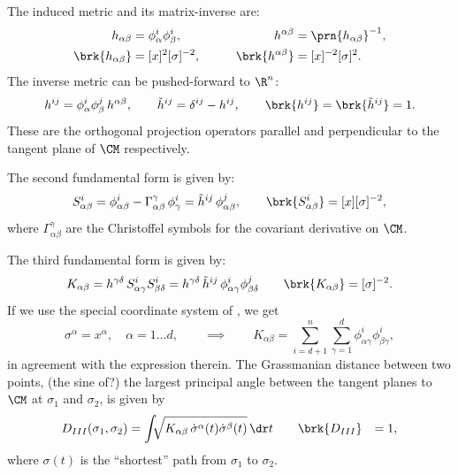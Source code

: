 \documentclass[12pt]{article}
\newcommand{\inv}{^{-1}}
\newcommand{\invsq}{^{-2}}
\begin{document}
The induced metric and its matrix-inverse are:
%
\begin{equation}\label{eq:inducedmet}
\begin{aligned}
  h_{\alpha\beta} &= \phi^i_\alpha \phi^i_\beta, \qquad&
  h^{\alpha\beta} &= \prn{h_{\alpha\beta}}\inv, \\
  \brk{h_{\alpha\beta}} &= [x]^2[\sigma]\invsq, \qquad&
  \brk{h^{\alpha\beta}} &= [x]\invsq[\sigma]^2. \\
\end{aligned}
\end{equation}
%
The inverse metric can be pushed-forward to $\R^n$:
%
\begin{equation}\label{eq:proj}
  h^{ij} = \phi^i_\alpha \phi^j_\beta \, h^{\alpha\beta}, \qquad
  \tilde{h}^{ij} = \delta^{ij} - h^{ij}, \qquad
  \brk{h^{ij}} = \brk{ \tilde{h}^{ij}} = 1.
\end{equation}
%
These are the orthogonal projection operators parallel and perpendicular to the tangent plane of $\CM$ respectively.

The second fundamental form is given by:
%
\begin{equation}\label{eq:extcurvtensor}
  S^i_{\alpha\beta} = \phi^i_{\alpha\beta} - \Gamma^\gamma_{\alpha\beta} \, \phi^i_\gamma
                    = \tilde{h}^{ij} \, \phi^j_{\alpha\beta},
  \qquad
  \brk{S^i_{\alpha\beta}} = [x][\sigma]\invsq,
\end{equation}
%
where $\Gamma^\gamma_{\alpha\beta}$ are the Christoffel symbols for the covariant derivative on $\CM$.

The third fundamental form is given by:
%
\begin{equation}\label{eq:grassmet}
  K_{\alpha\beta} = h^{\gamma\delta} \,  S^i_{\alpha\gamma} S^i_{\beta\delta}
                  = h^{\gamma\delta} \, \tilde{h}^{ij} \, \phi^i_{\alpha\gamma} \phi^j_{\beta\delta}
  \qquad
  \brk{K_{\alpha\beta}}=[\sigma]\invsq.
\end{equation}
%
If we use the special coordinate system of \cite[Appendix B]{clarkson2008tighter}, we get
%
\begin{equation}\label{eq:specialcoord}
  \sigma^\alpha = x^\alpha, \quad \alpha=1\ldots d,
  \qquad \implies \qquad
  K_{\alpha\beta} = \sum_{i=d+1}^n \sum_{\gamma=1}^d \phi^i_{\alpha\gamma} \phi^i_{\beta\gamma},
\end{equation}
%
in agreement with the expression therein.
The Grassmanian distance between two points, \ie (the sine of?) the largest principal angle between the tangent planes to $\CM$ at $\sigma_1$ and $\sigma_2$, is given by
%
\begin{equation}\label{eq:grass_dist_explicit}
\begin{aligned}
  D_{III}(\sigma_1,\sigma_2) &= \int\!\!\! \sqrt{K_{\alpha\beta} \, \dot{\sigma}^\alpha(t)\dot{\sigma}^\beta(t)}\, \dr t %
\qquad
  \brk{D_{III}}&=1,
\end{aligned}
\end{equation}
%
where $\sigma(t)$ is the ``shortest'' path from $\sigma_1$ to $\sigma_2$.
\end{document}
